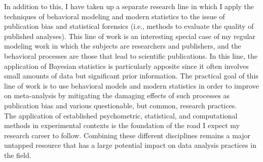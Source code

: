 \noindent In addition to this, I have taken up a separate research line in which I apply the techniques of behavioral modeling and modern statistics to the issue of publication bias and statistical forensics (i.e., methods to evaluate the quality of published analyses). This line of work is an interesting special case of my regular modeling work in which the subjects are researchers and publishers, and the behavioral processes are those that lead to scientific publications. In this line, the application of Bayesian statistics is particularly apposite since it often involves small amounts of data but significant prior information. The practical goal of this line of work is to use behavioral models and modern statistics in order to improve on meta-analysis by mitigating the damaging effects of such processes as publication bias and various questionable, but common, research practices.\\

\noindent The application of established psychometric, statistical, and computational methods in experimental contexts is the foundation of the road I expect my research career to follow. Combining these different disciplines remains a major untapped resource that has a large potential impact on data analysis practices in the field.